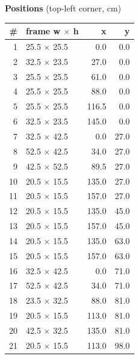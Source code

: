 \documentclass[a4paper,landscape,10pt]{article}
\begin{document}
\begin{minipage}[t]{0.25\textwidth}
\vspace{8pt}
{\bfseries Positions} (top-left corner, cm)\\[2pt]
\tiny
\begin{tabular}{@{}r l r r@{}}
\toprule
\# & frame w $\times$ h & x & y \\
\midrule
1 & 25.5 $\times$ 25.5 & 0.0 & 0.0 \\
2 & 32.5 $\times$ 23.5 & 27.0 & 0.0 \\
3 & 25.5 $\times$ 25.5 & 61.0 & 0.0 \\
4 & 25.5 $\times$ 25.5 & 88.0 & 0.0 \\
5 & 25.5 $\times$ 25.5 & 116.5 & 0.0 \\
6 & 32.5 $\times$ 23.5 & 145.0 & 0.0 \\
7 & 32.5 $\times$ 42.5 & 0.0 & 27.0 \\
8 & 52.5 $\times$ 42.5 & 34.0 & 27.0 \\
9 & 42.5 $\times$ 52.5 & 89.5 & 27.0 \\
10 & 20.5 $\times$ 15.5 & 135.0 & 27.0 \\
11 & 20.5 $\times$ 15.5 & 157.0 & 27.0 \\
12 & 20.5 $\times$ 15.5 & 135.0 & 45.0 \\
13 & 20.5 $\times$ 15.5 & 157.0 & 45.0 \\
14 & 20.5 $\times$ 15.5 & 135.0 & 63.0 \\
15 & 20.5 $\times$ 15.5 & 157.0 & 63.0 \\
16 & 32.5 $\times$ 42.5 & 0.0 & 71.0 \\
17 & 52.5 $\times$ 42.5 & 34.0 & 71.0 \\
18 & 23.5 $\times$ 32.5 & 88.0 & 81.0 \\
19 & 20.5 $\times$ 15.5 & 113.0 & 81.0 \\
20 & 42.5 $\times$ 32.5 & 135.0 & 81.0 \\
21 & 20.5 $\times$ 15.5 & 113.0 & 98.0 \\
\bottomrule
\end{tabular}
\end{minipage}
\clearpage
\end{document}
